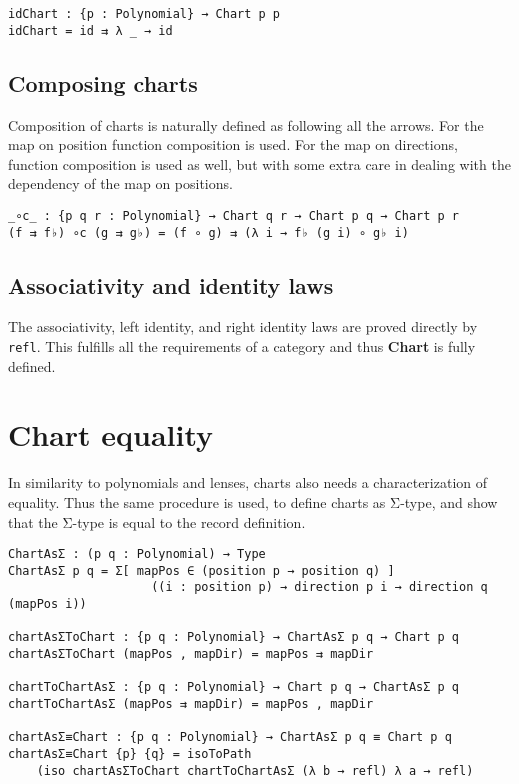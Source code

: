 \begin{verbatim}
idChart : {p : Polynomial} → Chart p p
idChart = id ⇉ λ _ → id
\end{verbatim}

\subsection{Composing charts}
Composition of charts is naturally defined as following all the arrows. For the map on position function composition is used. For the map on directions, function composition is used as well, but with some extra care in dealing with the dependency of the map on positions. 
\begin{verbatim}
_∘c_ : {p q r : Polynomial} → Chart q r → Chart p q → Chart p r
(f ⇉ f♭) ∘c (g ⇉ g♭) = (f ∘ g) ⇉ (λ i → f♭ (g i) ∘ g♭ i)
\end{verbatim}

\subsection{Associativity and identity laws}
The associativity, left identity, and right identity laws are proved directly by \texttt{refl}. This fulfills all the requirements of a category and thus \textbf{Chart} is fully defined.


\section{Chart equality}
In similarity to polynomials and lenses, charts also needs a characterization of equality. Thus the same procedure is used, to define charts as Σ-type, and show that the Σ-type is equal to the record definition.

\begin{verbatim}
ChartAsΣ : (p q : Polynomial) → Type
ChartAsΣ p q = Σ[ mapPos ∈ (position p → position q) ]
                    ((i : position p) → direction p i → direction q (mapPos i))

chartAsΣToChart : {p q : Polynomial} → ChartAsΣ p q → Chart p q
chartAsΣToChart (mapPos , mapDir) = mapPos ⇉ mapDir

chartToChartAsΣ : {p q : Polynomial} → Chart p q → ChartAsΣ p q
chartToChartAsΣ (mapPos ⇉ mapDir) = mapPos , mapDir

chartAsΣ≡Chart : {p q : Polynomial} → ChartAsΣ p q ≡ Chart p q
chartAsΣ≡Chart {p} {q} = isoToPath 
    (iso chartAsΣToChart chartToChartAsΣ (λ b → refl) λ a → refl)
\end{verbatim}

